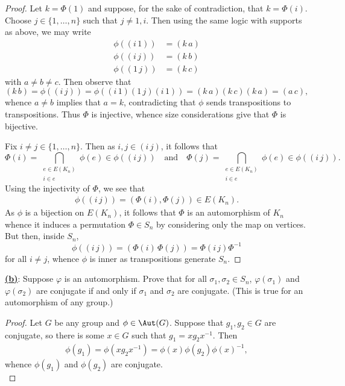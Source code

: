 \documentclass[12pt]{article}
\begin{document}
\begin{homeworkProblem}
\begin{proof}
    Let $ k = \Phi(1) $ and suppose, for the sake of contradiction, that $ k = \Phi(i) $. Choose $ j\in \{1,\ldots, n\} $ such that $ j\neq 1,i $. Then using the same logic with supports as above, we may write 
    \begin{align*}
      \phi((i\,1)) &= (k\,a)\\
      \phi((i\,j)) &= (k\,b)\\
      \phi((1\,j)) &= (k\,c)
    \end{align*}
    with $ a\neq b\neq c $. Then observe that 
    \[
      (k\,b) = \phi((i\,j)) = \phi((i\,1)(1\,j)(i\,1)) = (k\,a)(k\,c)(k\,a) = (a\,c),
    \]
    whence $ a\neq b $ implies that $ a = k $, contradicting that $ \phi $ sends transpositions to transpositions. Thus $ \Phi $ is injective, whence size considerations give that $ \Phi $ is bijective.


    Fix $ i\neq j\in \{1,\ldots,n\} $. Then as $ i,j \in (i\,j) $, it follows that 
    \[
      \Phi(i)=\bigcap_{\substack{e\in E(K_{n})\\i\in e}} \phi(e)\in \phi((i\,j))\quad \text{and}\quad \Phi(j) = \bigcap_{\substack{e\in E(K_{n})\\i\in e}} \phi(e) \in \phi((i\,j)).
    \]
    Using the injectivity of $ \Phi $, we see that
    \begin{align*}
    \phi((i\,j)) =  (\Phi(i), \Phi(j))  \in E(K_{n}).
    \end{align*}
    As $ \phi $ is a bijection on $ E(K_{n}) $, it follows that $ \Phi $ is an automorphism of $ K_{n} $ whence it induces a permutation $ \Phi\in S_{n} $ by considering only the map on vertices. But then, inside $ S_{n} $,
    \[
      \phi((i\,j)) = (\Phi(i)\,\Phi(j)) = \Phi (i\,j) \Phi^{-1}
    \]
    for all $ i\neq j $, whence $ \phi $ is inner as transpositions generate $ S_{n} $.
  \end{proof}

  \underline{\textbf{(b)}}: Suppose $\varphi$ is an automorphism. Prove that for all $\sigma_1, \sigma_2 \in S_n$, $\varphi(\sigma_1)$ and $\varphi(\sigma_2)$ are conjugate if and only if $\sigma_1$ and $\sigma_2$ are conjugate.  
  (This is true for an automorphism of any group.)\\

  \begin{proof}
    Let $ G $ be any group and $ \phi\in \Aut(G) $. Suppose that $ g_{1},g_{2}\in G $ are conjugate, so there is some $ x\in G $ such that $ g_{1}= xg_{2}x^{-1} $. Then 
    \begin{align*}
      \phi(g_{1}) = \phi(xg_{2}x^{-1}) = \phi(x) \phi(g_{2}) \phi(x)^{-1},
    \end{align*}
    whence $ \phi(g_{1}) $ and $ \phi(g_{2}) $ are conjugate.\\


\end{proof}
\end{homeworkProblem}
\end{document}
